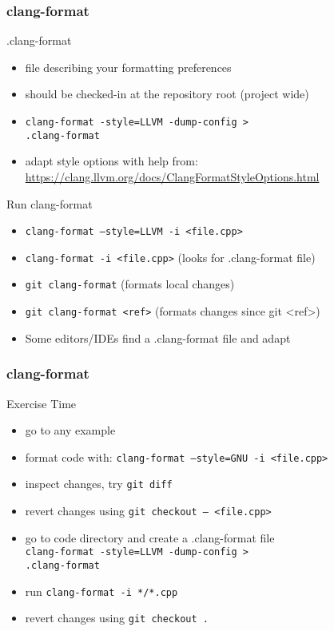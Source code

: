 \begin{frame}[fragile]
\frametitle{clang-format}
\begin{block}{.clang-format}
	\begin{itemize}
		\item file describing your formatting preferences
		\item should be checked-in at the repository root (project wide)
		\item \texttt{clang-format -style=LLVM -dump-config >} \\
		  \texttt{.clang-format}
		\item adapt style options with help from: \url{https://clang.llvm.org/docs/ClangFormatStyleOptions.html}
	\end{itemize}
\end{block}
\begin{block}{Run clang-format}
	\begin{itemize}
		\item \texttt{clang-format --style=LLVM -i <file.cpp>}
		\item \texttt{clang-format -i <file.cpp>} (looks for .clang-format file)
		\item \texttt{git clang-format} (formats local changes)
		\item \texttt{git clang-format <ref>} (formats changes since git \textless{}ref\textgreater{})
		\item Some editors/IDEs find a .clang-format file and adapt
	\end{itemize}
\end{block}
\end{frame}

\begin{frame}[fragile]
\frametitle{clang-format}
\begin{alertblock}{Exercise Time}
	\begin{itemize}
		\item go to any example
		\item format code with: \texttt{clang-format --style=GNU -i <file.cpp>}
		\item inspect changes, try \texttt{git diff}
		\item revert changes using \texttt{git checkout -- <file.cpp>}
		\item go to code directory and create a .clang-format file \\
		  \texttt{clang-format -style=LLVM -dump-config >} \\
		  \texttt{.clang-format}
		\item run \texttt{clang-format -i */*.cpp}
		\item revert changes using \texttt{git checkout .}
	\end{itemize}
\end{alertblock}
\end{frame}

